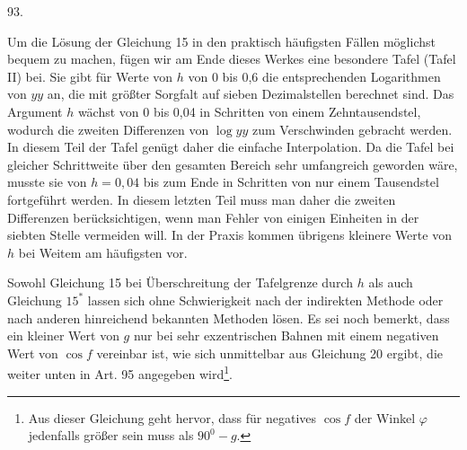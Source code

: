 \par{}\medskip
\hypertarget{native-126-article093}{}
\begin{center}93.\end{center}
Um die Lösung der Gleichung 15 in den praktisch häufigsten Fällen möglichst bequem zu machen, fügen wir am Ende dieses Werkes eine besondere Tafel (Tafel II) bei. Sie gibt für Werte von $h$ von 0 bis 0,6 die entsprechenden Logarithmen von $yy$ an, die mit größter Sorgfalt auf sieben Dezimalstellen berechnet sind. Das Argument $h$ wächst von 0 bis 0,04 in Schritten von einem Zehntausendstel, wodurch die zweiten Differenzen von $\log yy$ zum Verschwinden gebracht werden. In diesem Teil der Tafel genügt daher die einfache Interpolation. Da die Tafel bei gleicher Schrittweite über den gesamten Bereich sehr umfangreich geworden wäre, musste sie von $h=0{,}04$ bis zum Ende in Schritten von nur einem Tausendstel fortgeführt werden. In diesem letzten Teil muss man daher die zweiten Differenzen berücksichtigen, wenn man Fehler von einigen Einheiten in der siebten Stelle vermeiden will. In der Praxis kommen übrigens kleinere Werte von $h$ bei Weitem am häufigsten vor.

Sowohl Gleichung 15 bei Überschreitung der Tafelgrenze durch $h$ als auch Gleichung $15^{\ast}$ lassen sich ohne Schwierigkeit nach der indirekten Methode oder nach anderen hinreichend bekannten Methoden lösen. Es sei noch bemerkt, dass ein kleiner Wert von $g$ nur bei sehr exzentrischen Bahnen mit einem negativen Wert von $\cos f$ vereinbar ist, wie sich unmittelbar aus Gleichung 20 ergibt, die weiter unten in Art. 95 angegeben wird\footnote{Aus dieser Gleichung geht hervor, dass für negatives $\cos f$ der Winkel $\varphi$ jedenfalls größer sein muss als $90^0-g$.}.
